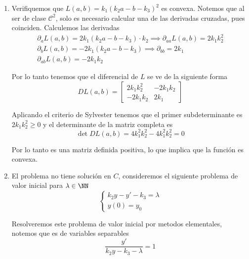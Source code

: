 \documentclass[a4paper,oneside,10.5pt]{USMArt}
\begin{document}
\begin{sol}
\begin{enumerate}
  \item Verifiquemos que $L(a, b) = k_{1}(k_{2}a - b - k_{3})^{2}$ es convexa.
        Notemos que al ser de clase $\mathcal{C}^{2}$, solo es necesario calcular una de las
        derivadas cruzadas, pues coinciden. Calculemos las derivadas
        \begin{gather*}
          \partial_{a} L(a, b) = 2k_{1}(k_{2}a - b -k_{3}) \cdot k_{2} \implies \partial_{aa}L(a, b) = 2k_{1}k_{2}^{2}\\
          \partial_{b} L(a, b) = -2k_{1}(k_{2}a - b - k_{3}) \implies \partial_{bb} = 2k_{1}\\
          \partial_{ab} L(a, b) = -2k_{1}k_{2}
        \end{gather*}

        Por lo tanto tenemos que el diferencial de $L$ se ve de la siguiente forma
        \begin{equation*}
          DL(a, b) = \begin{bmatrix}
            2k_{1}k_{2}^{2} & -2k_{1}k_{2}\\
            -2k_{1}k_{2}    & 2k_{1}
                     \end{bmatrix}
        \end{equation*}

        Aplicando el criterio de Sylvester tenemos que el primer subdeterminante es $2k_{1}k_{2}^{2} \geq 0$ y
        el determinante de la matriz completa es
        \begin{equation*}
          \det DL(a, b) = 4k_{1}^{2}k_{2}^{2} - 4k_{1}^{2}k_{2}^{2} = 0
        \end{equation*}

        Por lo tanto es una matriz definida positiva, lo que implica que la función es convexa.

  \item El problema no tiene soluci\'on en $C$, consideremos el siguiente problema de valor inicial para
        $\lambda \in \NN$
        \begin{equation*}
          \begin{cases}
            k_{2}y - y' - k_{3} = \lambda\\
            y(0) = y_{0}
          \end{cases}
        \end{equation*}

        Resolveremos este problema de valor inicial por metodos elementales, notemos que es de variables separables
        \begin{equation*}
          \frac{y'}{k_{2}y - k_{3} - \lambda} = 1
        \end{equation*}


\end{enumerate}
\end{sol}
\end{document}
